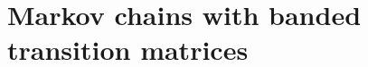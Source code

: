\documentclass[11pt]{amsart}
\theoremstyle{plain}
\newtheorem{teo}{Theorem}[section]
\renewcommand{\d}{\operatorname{d}}
\newcommand{\1}{\text{\fontseries{bx}\selectfont \textup 1}}
\begin{document}
%
%	

\section{Markov chains with banded transition matrices}
\end{document}
